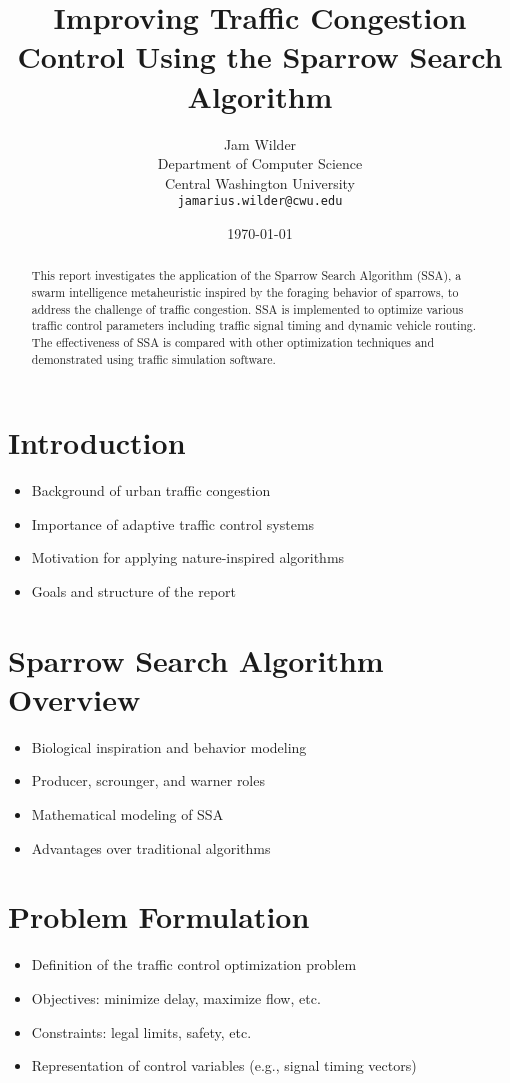 \documentclass[12pt]{article}
\title{Improving Traffic Congestion Control Using the Sparrow Search Algorithm}
\author{Jam Wilder \\
Department of Computer Science \\
Central Washington University \\
\texttt{jamarius.wilder@cwu.edu}}
\date{\today}
\begin{document}
\maketitle
\thispagestyle{empty}
\newpage

\tableofcontents
\newpage

\begin{abstract}
This report investigates the application of the Sparrow Search Algorithm (SSA), a swarm intelligence metaheuristic inspired by the foraging behavior of sparrows, to address the challenge of traffic congestion. SSA is implemented to optimize various traffic control parameters including traffic signal timing and dynamic vehicle routing. The effectiveness of SSA is compared with other optimization techniques and demonstrated using traffic simulation software.
\end{abstract}

\newpage

\section{Introduction}
\begin{itemize}[leftmargin=2em]
    \item Background of urban traffic congestion
    \item Importance of adaptive traffic control systems
    \item Motivation for applying nature-inspired algorithms
    \item Goals and structure of the report
\end{itemize}

\section{Sparrow Search Algorithm Overview}
\begin{itemize}[leftmargin=2em]
    \item Biological inspiration and behavior modeling
    \item Producer, scrounger, and warner roles
    \item Mathematical modeling of SSA
    \item Advantages over traditional algorithms
\end{itemize}

\section{Problem Formulation}
\begin{itemize}[leftmargin=2em]
    \item Definition of the traffic control optimization problem
    \item Objectives: minimize delay, maximize flow, etc.
    \item Constraints: legal limits, safety, etc.
    \item Representation of control variables (e.g., signal timing vectors)
\end{itemize}
\end{document}
